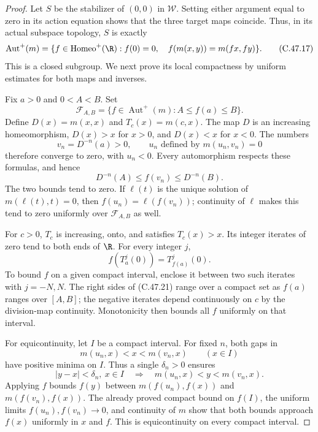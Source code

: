 \begin{proof}
Let $S$ be the stabilizer of $(0,0)$ in $\mathcal W$.
Setting either argument equal to zero in its action equation
shows that the three target maps coincide. Thus, in its actual
subspace topology, $S$ is exactly
\[
 \operatorname{Aut}^+(m)=
 \{f\in\operatorname{Homeo}^+(\R):
       f(0)=0,\quad f(m(x,y))=m(fx,fy)\}.                 \tag{C.47.17}
\]
This is a closed subgroup. We next prove its local compactness
by uniform estimates for both maps and inverses.

Fix $a>0$ and $0<A<B$. Set
\[
 \mathcal F_{A,B}=\{f\in\operatorname{Aut}^+(m):
                            A\leq f(a)\leq B\}.
                                                        \tag{C.47.18}
\]
Define $D(x)=m(x,x)$ and $T_c(x)=m(c,x)$.
The map $D$ is an increasing homeomorphism,
$D(x)>x$ for $x>0$, and $D(x)<x$ for $x<0$.
The numbers
\[
 v_n=D^{-n}(a)>0,\qquad
 u_n\text{ defined by }m(u_n,v_n)=0                      \tag{C.47.19}
\]
therefore converge to zero, with $u_n<0$.
Every automorphism respects these formulas, and hence
\[
 D^{-n}(A)\leq f(v_n)\leq D^{-n}(B).
                                                        \tag{C.47.20}
\]
The two bounds tend to zero. If $\ell(t)$ is the unique
solution of $m(\ell(t),t)=0$, then
$f(u_n)=\ell(f(v_n))$; continuity of $\ell$ makes this tend
to zero uniformly over $\mathcal F_{A,B}$ as well.

For $c>0$, $T_c$ is increasing, onto, and satisfies $T_c(x)>x$.
Its integer iterates of zero tend to both ends of $\R$.
For every integer $j$,
\[
                       f(T_a^j(0))=T_{f(a)}^j(0).       \tag{C.47.21}
\]
To bound $f$ on a given compact interval, enclose it between
two such iterates with $j=-N,N$.
The right sides of (C.47.21) range over a compact set as
$f(a)$ ranges over $[A,B]$; the negative iterates depend
continuously on $c$ by the division-map continuity.
Monotonicity then bounds all $f$ uniformly on that interval.

For equicontinuity, let $I$ be a compact interval.
For fixed $n$, both gaps in
\[
                 m(u_n,x)<x<m(v_n,x)\qquad(x\in I)
 \]
have positive minima on $I$. Thus a single $\delta_n>0$
ensures
\[
 |y-x|<\delta_n,\ x\in I
 \quad\Longrightarrow\quad
                   m(u_n,x)<y<m(v_n,x).
 \]
Applying $f$ bounds $f(y)$ between
$m(f(u_n),f(x))$ and $m(f(v_n),f(x))$.
The already proved compact bound on $f(I)$, the uniform limits
$f(u_n),f(v_n)\to0$, and continuity of $m$ show that both
bounds approach $f(x)$ uniformly in $x$ and $f$.
This is equicontinuity on every compact interval.


\end{proof}
